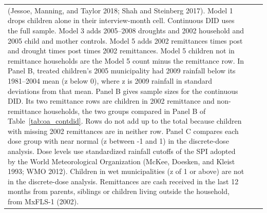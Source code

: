 \documentclass[12pt]{article}
\begin{document}
\begin{longtable}{@{\extracolsep{\fill}}lcc}
{(Jessoe, Manning, and Taylor 2018; Shah and Steinberg 2017). Model 1 drops children alone in their interview-month cell. Continuous DID uses the full sample. Model 3 adds 2005--2008 droughts and 2002 household and 2005 child and mother controls.
Model 5 adds 2002 remittances times post and drought times post times 2002 remittances. Model 5 children not in remittance households are the Model 5 count minus the remittance row. In Panel B, treated children's 2005 municipality had 2009
rainfall below its 1981--2004 mean (z below 0), where z is 2009 rainfall in standard deviations from that mean. Panel B gives sample sizes for the continuous DID. Its two remittance rows are children in 2002 remittance and non-remittance households, the two groups compared in Panel B of Table~\ref{tab:oa_contdid}.
Rows do not add up to the total because children with missing 2002 remittances are in neither row. Panel C compares each dose group with near normal (z between -1 and 1) in the discrete-dose analysis.
Dose levels use standardized rainfall cutoffs of the SPI adopted by the World Meteorological Organization (McKee, Doesken, and Kleist 1993; WMO 2012). Children in wet municipalities (z of 1 or above) are not in the discrete-dose analysis.
Remittances are cash received in the last 12 months from parents, siblings or children living outside the household, from MxFLS-1 (2002).}\\
\end{longtable}
\endgroup
\clearpage
\begingroup
\footnotesize
\renewcommand{\arraystretch}{0.86}
\setlength{\tabcolsep}{4pt}
\setlength{\LTcapwidth}{\textwidth}
\setlength{\LTleft}{0pt}
\setlength{\LTright}{0pt plus 1fil}
\end{document}
